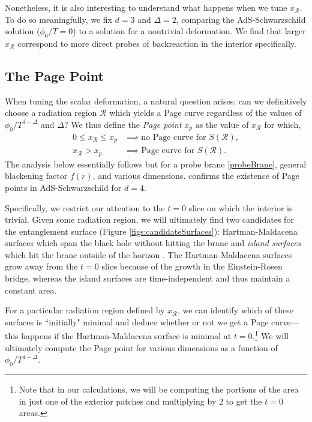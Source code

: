 \documentclass[12pt,a4paper]{article}
\begin{document}
Nonetheless, it is also interesting to understand what happens when we tune $x_\mathcal{R}$. To do so meaningfully, we fix $d = 3$ and $\Delta = 2$, comparing the AdS-Schwarzschild solution ($\phi_0/T = 0$) to a solution for a nontrivial deformation. We find that larger $x_\mathcal{R}$ correspond to more direct probes of backreaction in the interior specifically.

\subsection{The Page Point}\label{sec3.1}

When tuning the scalar deformation, a natural question arises: can we definitively choose a radiation region $\mathcal{R}$ which yields a Page curve regardless of the values of $\phi_0/T^{d-\Delta}$ and $\Delta$? We thus define the \textit{Page point} $x_p$ as the value of $x_\mathcal{R}$ for which,
\begin{align}
0 \leq x_\mathcal{R} \leq x_p &\implies \text{no Page curve for }S(\mathcal{R}),\\
x_\mathcal{R} > x_p &\implies \text{Page curve for }S(\mathcal{R}).
\end{align}
The analysis below essentially follows \cite{Geng:2020qvw} but for a probe brane \eqref{probeBrane}, general blackening factor $f(r)$, and various dimensions. \cite{Geng:2020qvw} confirms the existence of Page points in AdS-Schwarzschild for $d = 4$.

Specifically, we restrict our attention to the $t = 0$ slice on which the interior is trivial. Given some radiation region, we will ultimately find two candidates for the entanglement surface (Figure \ref{figs:candidateSurfaces}): Hartman-Maldacena surfaces \cite{Hartman:2013qma} which span the black hole without hitting the brane and \textit{island surfaces} which hit the brane outside of the horizon \cite{Almheiri:2019yqk}. The Hartman-Maldacena surfaces grow away from the $t = 0$ slice because of the growth in the Einstein-Rosen bridge, whereas the island surfaces are time-independent and thus maintain a constant area.



For a particular radiation region defined by $x_\mathcal{R}$, we can identify which of these surfaces is ``initially" minimal and deduce whether or not we get a Page curve---this happens if the Hartman-Maldacena surface is minimal at $t = 0$.\footnote{Note that in our calculations, we will be computing the portions of the area in just one of the exterior patches and multiplying by $2$ to get the $t = 0$ areas.} We will ultimately compute the Page point for various dimensions as a function of $\phi_0/T^{d-\Delta}$.
\end{document}
